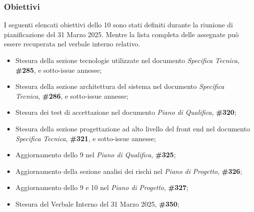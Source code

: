 \subsubsection{Obiettivi}
\label{sec:obiettivi_sprint10}

I seguenti elencati obiettivi dello  10 sono stati definiti durante la riunione di pianificazione del 31 Marzo 2025.
Mentre la lista completa delle  assegnate può essere recuperata nel verbale interno relativo.

\begin{itemize}
    \item Stesura della sezione tecnologie utilizzate nel documento \textit{Specifica Tecnica},  \textbf{\#285}, e sotto-issue annesse;
    \item Stesura della sezione architettura del sistema nel documento \textit{Specifica Tecnica},  \textbf{\#286}, e sotto-issue annesse;
    \item Stesura dei test di accettazione nel documento \textit{Piano di Qualifica},  \textbf{\#320};
    \item Stesura della sezione progettazione ad alto livello del front end nel documento \textit{Specifica Tecnica},  \textbf{\#321}, e sotto-issue annesse;
    \item Aggiornamento dello  9 nel \textit{Piano di Qualifica},  \textbf{\#325};
    \item Aggiornamento della sezione analisi dei rischi nel \textit{Piano di Progetto},  \textbf{\#326};
    \item Aggiornamento dello  9 e 10 nel \textit{Piano di Progetto},  \textbf{\#327};
    \item Stesura del Verbale Interno del 31 Marzo 2025,  \textbf{\#350};
\end{itemize}